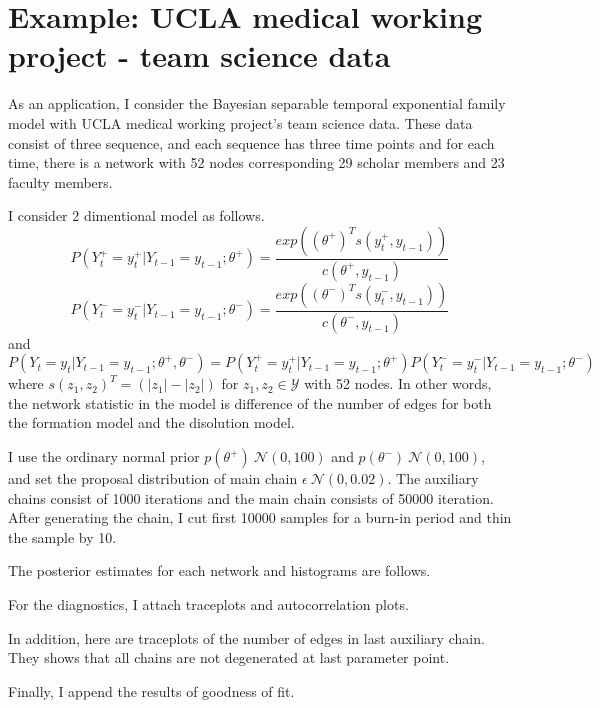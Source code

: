 \documentclass[aspectratio=169,ignorenonframetext,9pt]{beamer}
\theoremstyle{plain}
\theoremstyle{definition}
\begin{document}
\section{Example: UCLA medical working project - team science data}
As an application, I consider the Bayesian separable temporal exponential family model with UCLA medical working project's team science data.
These data consist of three sequence,
and each sequence has three time points and for each time,
there is a network with 52 nodes corresponding 29 scholar members and 23 faculty members.


I consider 2 dimentional model as follows.
\[P(Y_t^+=y_t^+|Y_{t-1}=y_{t-1};\theta^+) = \frac{exp((\theta^+)^{T}s(y_t^+, y_{t-1}))}{c(\theta^+, y_{t-1})}\]
\[P(Y_t^-=y_t^-|Y_{t-1}=y_{t-1};\theta^-) = \frac{exp((\theta^-)^{T}s(y_t^-, y_{t-1}))}{c(\theta^-, y_{t-1})}\]
and
\[P(Y_t=y_t|Y_{t-1}=y_{t-1};\theta^+,\theta^-)=P(Y_t^+=y_t^+|Y_{t-1}=y_{t-1};\theta^+) P(Y_t^-=y_t^-|Y_{t-1}=y_{t-1};\theta^-)\]
where
\(s(z_1,z_2)^T=(|z_1|-|z_2|)\)
for $z_1,z_2\in\mathcal{Y}$ with 52 nodes. In other words, the network statistic in the model is
difference of the number of edges for both the formation model and the disolution model.

I use the ordinary normal prior $p(\theta^+)~\mathcal{N}(0,100)$ and $p(\theta^-)~\mathcal{N}(0,100)$,
and set the proposal distribution of main chain $\epsilon~\mathcal{N}(0,0.02)$.
The auxiliary chains consist of 1000 iterations and the main chain consists of 50000 iteration.
After generating the chain, I cut first 10000 samples for a burn-in period and thin the sample by 10.

The posterior estimates for each network and histograms are follows.

For the diagnostics, I attach traceplots and autocorrelation plots.

In addition, here are traceplots of the number of edges in last auxiliary chain.
They shows that all chains are not degenerated at last parameter point.

Finally, I append the results of goodness of fit.
\end{document}
